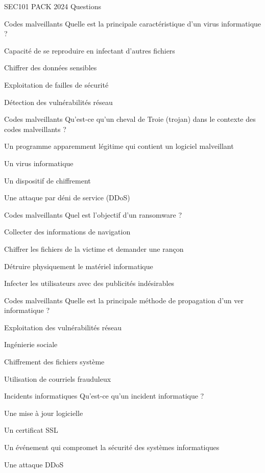 \documentclass[12pt]{article}
\begin{document}
\begin{quiz}{SEC101 PACK 2024 Questions}
     \begin{multi}[points=1]{Codes malveillants}
     Quelle est la principale caractéristique d'un virus informatique ?
        \item *Capacité de se reproduire en infectant d'autres fichiers
        \item Chiffrer des données sensibles
        \item Exploitation de failles de sécurité
        \item Détection des vulnérabilités réseau
      \end{multi} 
    
     \begin{multi}[points=1]{Codes malveillants}
     Qu'est-ce qu'un cheval de Troie (trojan) dans le contexte des codes malveillants ?
        \item *Un programme apparemment légitime qui contient un logiciel malveillant
        \item Un virus informatique
        \item Un dispositif de chiffrement
        \item Une attaque par déni de service (DDoS)
      \end{multi} 
    
     \begin{multi}[points=1]{Codes malveillants}
     Quel est l'objectif d'un ransomware ?
        \item Collecter des informations de navigation
        \item *Chiffrer les fichiers de la victime et demander une rançon
        \item Détruire physiquement le matériel informatique
        \item Infecter les utilisateurs avec des publicités indésirables
      \end{multi} 
    
     \begin{multi}[points=1]{Codes malveillants}
     Quelle est la principale méthode de propagation d'un ver informatique ?
        \item *Exploitation des vulnérabilités réseau
        \item Ingénierie sociale
        \item Chiffrement des fichiers système
        \item Utilisation de courriels frauduleux
      \end{multi} 
    
     \begin{multi}[points=1]{Incidents informatiques}
     Qu'est-ce qu'un incident informatique ?
        \item Une mise à jour logicielle
        \item Un certificat SSL
        \item *Un événement qui compromet la sécurité des systèmes informatiques
        \item Une attaque DDoS
      \end{multi} 
    

\end{quiz}
\end{document}
